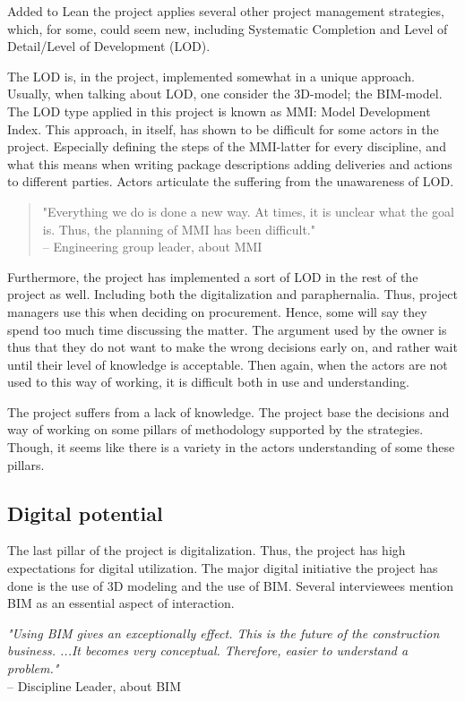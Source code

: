 Added to Lean the project applies several other project management strategies, which, for some, could seem new, including Systematic Completion and Level of Detail/Level of Development (LOD).  

The LOD is, in the project, implemented somewhat in a unique approach. Usually, when talking about LOD, one consider the 3D-model; the BIM-model. The LOD type applied in this project is known as MMI: Model Development Index. This approach, in itself, has shown to be difficult for some actors in the project. Especially defining the steps of the MMI-latter for every discipline, and what this means when writing package descriptions adding deliveries and actions to different parties. Actors articulate the suffering from the unawareness of LOD. 
\begin{quote}
    "Everything we do is done a new way. At times, it is unclear what the goal is. Thus, the planning of MMI has been difficult." \\
    – Engineering group leader, about MMI
\end{quote}
 
Furthermore, the project has implemented a sort of LOD in the rest of the project as well. Including both the digitalization and paraphernalia. Thus, project managers use this when deciding on procurement. Hence, some will say they spend too much time discussing the matter. The argument used by the owner is thus that they do not want to make the wrong decisions early on, and rather wait until their level of knowledge is acceptable. Then again, when the actors are not used to this way of working, it is difficult both in use and understanding.

The project suffers from a lack of knowledge. The project base the decisions and way of working on some pillars of methodology supported by the strategies. Though, it seems like there is a variety in the actors understanding of some these pillars. 


\subsection{Digital potential}
The last pillar of the project is digitalization. Thus, the project has high expectations for digital utilization. The major digital initiative the project has done is the use of 3D modeling and the use of BIM. Several interviewees mention BIM as an essential aspect of interaction. 

\textit{"Using BIM gives an exceptionally effect. This is the future of the construction business. ...It becomes very conceptual. Therefore, easier to understand a problem."} \\
– Discipline Leader, about BIM

